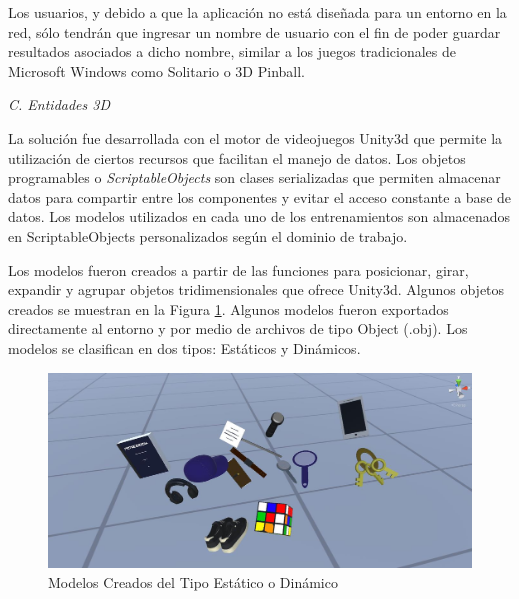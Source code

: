 \documentclass[conference]{IEEEtran}
\begin{document}
Los usuarios, y debido a que la aplicación no está diseñada para un entorno en la red, sólo tendrán que ingresar un nombre de usuario con el fin de poder guardar resultados asociados a dicho nombre, similar a los juegos tradicionales de Microsoft Windows como Solitario o 3D Pinball.
\bigskip

\textit{C. Entidades 3D}
\medskip

La solución fue desarrollada con el motor de videojuegos Unity3d \cite{UNITY} que permite la utilización de ciertos recursos que facilitan el manejo de datos. Los objetos programables o \textit{ScriptableObjects} son clases serializadas que permiten almacenar datos para compartir entre los componentes y evitar el acceso constante a base de datos. Los modelos utilizados en cada uno de los entrenamientos son almacenados en ScriptableObjects personalizados según el dominio de trabajo.

Los modelos fueron creados a partir de las funciones para posicionar, girar, expandir y agrupar objetos tridimensionales que ofrece Unity3d. Algunos objetos creados se muestran en la Figura \ref{fig:objects}. Algunos modelos fueron exportados directamente al entorno y por medio de archivos de tipo Object (.obj). Los modelos se clasifican en dos tipos: Estáticos y Dinámicos.

\begin{figure}[htpb!]
 \centering 
\includegraphics[width=1.0\columnwidth]{images/objects.jpg}
\caption{Modelos Creados del Tipo Estático o Dinámico}
\label{fig:objects}
\end{figure}
\end{document}
